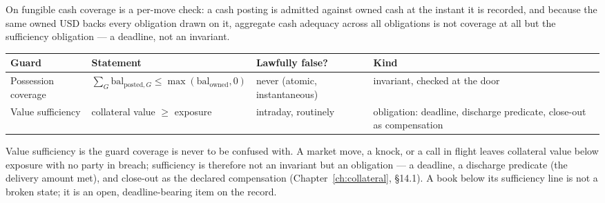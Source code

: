 On fungible cash coverage is a per-move check: a cash posting is admitted against owned
cash at the instant it is recorded, and because the same owned USD backs every
obligation drawn on it, aggregate cash adequacy across all obligations is not coverage
at all but the sufficiency obligation --- a deadline, not an invariant.

\begin{center}
\begin{tabular}{@{}p{}p{}p{}p{}@{}}
\toprule
Guard & Statement & Lawfully false? & Kind \\
\midrule
Possession coverage & $\sum_G \mathrm{bal}_{\mathrm{posted},G} \le \max(\mathrm{bal}_{\mathrm{owned}},0)$ & never (atomic, instantaneous) & invariant, checked at the door \\
Value sufficiency & collateral value $\ge$ exposure & intraday, routinely & obligation: deadline, discharge predicate, close-out as compensation \\
\bottomrule
\end{tabular}
\end{center}

\noindent Value sufficiency is the guard coverage is never to be confused with. A
market move, a knock, or a call in flight leaves collateral value below exposure
with no party in breach; sufficiency is therefore not an invariant but an
obligation --- a deadline, a discharge predicate (the delivery amount met), and
close-out as the declared compensation (Chapter~\ref{ch:collateral}, \S 14.1). A
book below its sufficiency line is not a broken state; it is an open,
deadline-bearing item on the record.

